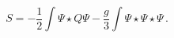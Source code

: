\begin{equation}
S = -\frac{1}{2}\int \Psi \star Q \Psi -\frac{g}{3}  \int \Psi \star
\Psi \star \Psi\,.
\label{eq:SFT-action}
\end{equation}


